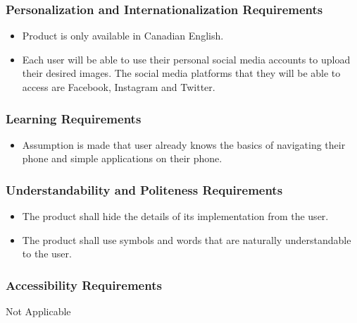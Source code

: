 \documentclass[]{article}
\begin{document}
\subsubsection{Personalization and Internationalization Requirements}
\label{ssub:personalization_and_internationalization_requirements}
\begin{itemize}
	\item Product is only available in Canadian English.
\item Each user will be able to use their personal social media accounts to upload their desired images. The social media platforms that they will be able to access are Facebook, Instagram and Twitter.
\end{itemize}

\subsubsection{Learning Requirements}
\label{ssub:learning_requirements}
\begin{itemize}
	\item Assumption is made that user already knows the basics of navigating their phone and simple applications on their phone.
\end{itemize}

\subsubsection{Understandability and Politeness Requirements}
\label{ssub:understandability_and_politeness_requirements}
\begin{itemize}
	\item The product shall hide the details of its implementation from the user.
	\item The product shall use symbols and words that are naturally understandable to the user.
\end{itemize}

\subsubsection{Accessibility Requirements}
\label{ssub:accessibility_requirements}
	Not Applicable
\end{document}
